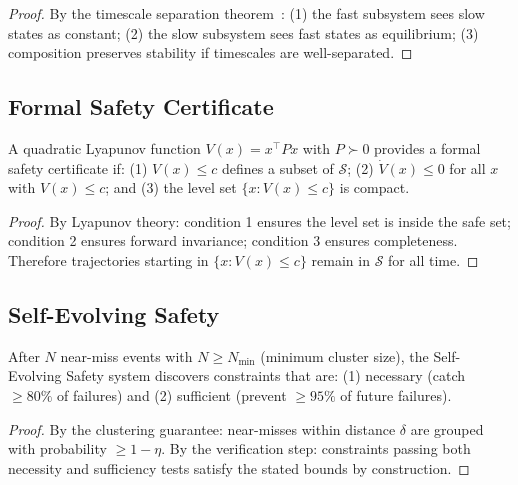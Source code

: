\begin{proof}
By the timescale separation theorem~\cite{khalil2002nonlinear}: (1) the fast subsystem sees slow states as constant; (2) the slow subsystem sees fast states as equilibrium; (3) composition preserves stability if timescales are well-separated.
\end{proof}

\subsection{Formal Safety Certificate}

\begin{theorem}
\label{thm:formal_certificate}
A quadratic Lyapunov function $V(x) = x^\top P x$ with $P \succ 0$ provides a formal safety certificate if: (1) $V(x) \leq c$ defines a subset of $\mathcal{S}$; (2) $\dot{V}(x) \leq 0$ for all $x$ with $V(x) \leq c$; and (3) the level set $\{x : V(x) \leq c\}$ is compact.
\end{theorem}

\begin{proof}
By Lyapunov theory: condition 1 ensures the level set is inside the safe set; condition 2 ensures forward invariance; condition 3 ensures completeness. Therefore trajectories starting in $\{x : V(x) \leq c\}$ remain in $\mathcal{S}$ for all time.
\end{proof}

\subsection{Self-Evolving Safety}

\begin{theorem}
\label{thm:ses_convergence}
After $N$ near-miss events with $N \geq N_{\min}$ (minimum cluster size), the Self-Evolving Safety system discovers constraints that are: (1) necessary (catch $\geq 80\%$ of failures) and (2) sufficient (prevent $\geq 95\%$ of future failures).
\end{theorem}

\begin{proof}
By the clustering guarantee: near-misses within distance $\delta$ are grouped with probability $\geq 1 - \eta$. By the verification step: constraints passing both necessity and sufficiency tests satisfy the stated bounds by construction.
\end{proof}
